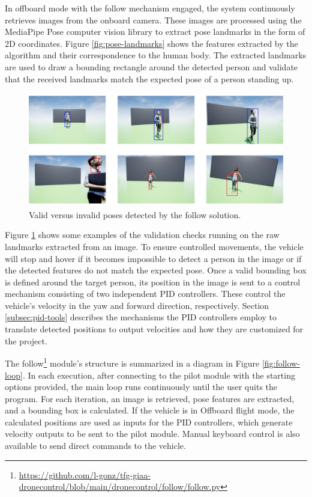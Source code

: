 In offboard mode with the follow mechanism engaged, the system continuously retrieves images from the onboard camera. These images are processed using the MediaPipe Pose \cite{mp-pose-paper} computer vision library to extract pose landmarks in the form of 2D coordinates. 
Figure \ref{fig:pose-landmarks} shows the features extracted by the algorithm and their correspondence to the human body.
The extracted landmarks are used to draw a bounding rectangle around the detected person and validate that the received landmarks match the expected pose of a person standing up.

\begin{figure}
  \centering
  \includegraphics[width=\textwidth, keepaspectratio]{img/pose-validation.jpg}
  \caption{Valid versus invalid poses detected by the follow solution.}
  \label{fig:pose-validation}
\end{figure}

Figure \ref{fig:pose-validation} shows some examples of the validation checks running on the raw landmarks extracted from an image.
To ensure controlled movements, the vehicle will stop and hover if it becomes impossible to detect a person in the image or if the detected features do not match the expected pose. Once a valid bounding box is defined around the target person, its position in the image is sent to a control mechanism consisting of two independent PID controllers. These control the vehicle's velocity in the yaw and forward direction, respectively. Section \ref{subsec:pid-tools} describes the mechanisms the PID controllers employ to translate detected positions to output velocities and how they are customized for the project.




The follow\footnote{\url{https://github.com/l-gonz/tfg-giaa-dronecontrol/blob/main/dronecontrol/follow/follow.py}} module's structure is summarized in a diagram in Figure \ref{fig:follow-loop}.
In each execution, after connecting to the pilot module with the starting options provided, the main loop runs continuously until the user quits the program.
For each iteration, an image is retrieved, pose features are extracted, and a bounding box is calculated. If the vehicle is in Offboard flight mode, the calculated positions are used as inputs for the PID controllers, which generate velocity outputs to be sent to the pilot module. Manual keyboard control is also available to send direct commands to the vehicle.

